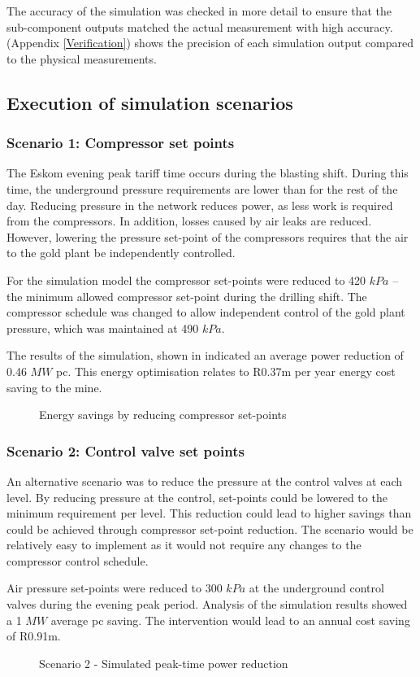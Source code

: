 \par
The accuracy of the simulation was checked in more detail to ensure that the sub-component outputs matched the actual measurement with high accuracy. (Appendix \ref{Verification}) shows the precision of each simulation output compared to the physical measurements.
\subsection{Execution of simulation scenarios}
\subsubsection{Scenario 1: Compressor set points}
The Eskom evening peak tariff time occurs during the blasting shift. During this time, the underground pressure requirements are lower than for the rest of the day. Reducing pressure in the network reduces power, as less work is required from the compressors. In addition, losses caused by air leaks are reduced. However, lowering the pressure  set-point of the compressors requires that the air to the gold plant be independently controlled. 
\par 
For the simulation model the compressor set-points were reduced  to 420 $kPa$ – the minimum allowed compressor  set-point during the drilling shift. The compressor schedule was changed to allow independent control of the gold plant pressure, which was maintained at 490 $kPa$. 
\par 
The results of the simulation, shown in  indicated an average power reduction of 0.46 $MW$ \gls{pc}. This energy optimisation relates to R0.37m per year energy cost saving to the mine.
\clearpage 
\begin{figure}[!htbp]
	\centering
	
	\caption{Energy savings by reducing compressor set-points}
	\label{fig: CompSetpoints Results Beatrix}
\end{figure}

\subsubsection{Scenario 2: Control valve set points}
An alternative scenario was to reduce the pressure at the control valves at each level. By reducing pressure at the control,  set-points could be lowered to the minimum requirement per level. This reduction could lead to higher savings than could be achieved through compressor set-point reduction. The scenario would be relatively easy to implement as it would not require any changes to the compressor control schedule.
\par 
Air pressure set-points were reduced to 300 $kPa$ at the underground control valves during the evening peak period. Analysis of the simulation results showed a 1 $MW$ average \gls{pc} saving. The intervention would lead to an annual cost saving of R0.91m.
\begin{figure}[h!]
	\centering
	
	\caption{Scenario 2 - Simulated peak-time power reduction}
	\label{fig: Control Valve Results Beatrix}
\end{figure}
